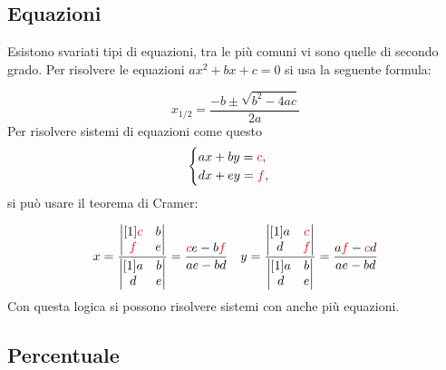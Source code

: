 \subsection{Equazioni}
Esistono svariati tipi di equazioni, tra le più comuni vi sono quelle di secondo grado. Per risolvere le equazioni   $ax^{2}+bx+c=0$  
si usa la seguente formula:

\begin{equation*}
  x_{1/2}={\frac{-b\pm\sqrt{b^{2}-4ac}}{2a}}
\end{equation*}
Per risolvere sistemi di equazioni come questo
\begin{equation*}
  \begin{cases}  ax+by= \textcolor{red}{c}, \\ dx+ey= \textcolor{red}{f},\\ 
  \end{cases}
\end{equation*}
si può usare il teorema di Cramer:

\begin{equation*}
  x=\dfrac{\begin{vmatrix}[1]
      \textcolor{red}{c} & b \\  
      \textcolor{red}{f} & e 
    \end{vmatrix}}{\begin{vmatrix}[1] 
  a & b \\ d & e \end{vmatrix}}= 
  \dfrac{\textcolor{red}{c}e-b\textcolor{red}{f}}{ae-bd}     \quad 
y=\dfrac{\begin{vmatrix}[1]  a &\textcolor{red}{c} \\ d &  \textcolor{red}{f} \end{vmatrix}}
{\begin{vmatrix}[1]  a & b \\ d & e \end{vmatrix}}= 
  \dfrac{a \textcolor{red}{f}- \textcolor{red}{c}d}{ae-bd}
\end{equation*}
Con questa logica si possono risolvere sistemi con anche più equazioni.



\subsection{Percentuale}

